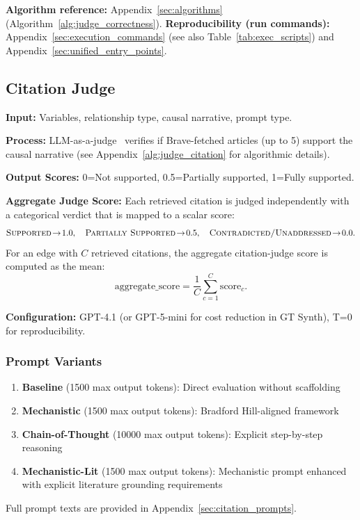 \textbf{Algorithm reference:} Appendix~\ref{sec:algorithms} (Algorithm~\ref{alg:judge_correctness}). \textbf{Reproducibility (run commands):} Appendix~\ref{sec:execution_commands} (see also Table~\ref{tab:exec_scripts}) and Appendix~\ref{sec:unified_entry_points}.

\subsection{Citation Judge}
\label{sec:citation_judge}

\textbf{Input:} Variables, relationship type, causal narrative, prompt type.

\textbf{Process:} LLM-as-a-judge~\cite{zheng2024llmasajudge} verifies if Brave-fetched articles (up to 5) support the causal narrative (see Appendix~\ref{alg:judge_citation} for algorithmic details).

\textbf{Output Scores:} 0=Not supported, 0.5=Partially supported, 1=Fully supported.

\textbf{Aggregate Judge Score:} Each retrieved citation is judged independently with a categorical verdict that is mapped to a scalar score:
\[
\textsc{Supported}\!\to\!1.0,\quad
\textsc{Partially Supported}\!\to\!0.5,\quad
\textsc{Contradicted/Unaddressed}\!\to\!0.0.
\]
For an edge with \(C\) retrieved citations, the aggregate citation-judge score is computed as the mean:
\[
\text{aggregate\_score}=\frac{1}{C}\sum_{c=1}^{C}\text{score}_c.
\]

\textbf{Configuration:} GPT-4.1 (or GPT-5-mini for cost reduction in GT Synth), T=0 for reproducibility.

\subsubsection{Prompt Variants}
\begin{enumerate}[noitemsep]
    \item \textbf{Baseline} (1500 max output tokens): Direct evaluation without scaffolding
    \item \textbf{Mechanistic} (1500 max output tokens): Bradford Hill-aligned framework
    \item \textbf{Chain-of-Thought} (10000 max output tokens): Explicit step-by-step reasoning
    \item \textbf{Mechanistic-Lit} (1500 max output tokens): Mechanistic prompt enhanced with explicit literature grounding requirements
\end{enumerate}
Full prompt texts are provided in Appendix~\ref{sec:citation_prompts}.

